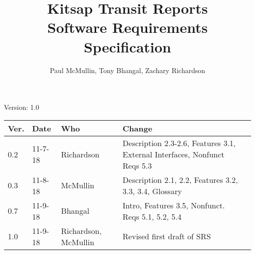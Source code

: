 \documentclass[letterpaper,12pt]{article}
\title{Kitsap Transit Reports\\Software Requirements Specification}
\author{Paul McMullin, Tony Bhangal, Zachary Richardson}
\begin{document}
\maketitle

\begin{center}
  Version: 1.0
\end{center}

\vfill
\begin{tabularx}{\linewidth}{|l|l|l|X|l|}\hline
Ver. & Date & Who & Change \\\hline
0.2     &  11-7-18    &  Richardson   &   Description 2.3-2.6, Features 3.1, External Interfaces, Nonfunct Reqs 5.3  \\\hline
0.3     &  11-8-18    &  McMullin   &  Description 2.1, 2.2, Features 3.2, 3.3, 3.4, Glossary \\\hline
0.7  &   11-9-18   &  Bhangal  & Intro, Features 3.5, Nonfunct. Reqs 5.1, 5.2, 5.4     \\\hline
1.0  &   11-9-18   &  Richardson, McMullin   & Revised first draft of SRS    \\\hline
\end{tabularx}

\newpage







\appendix 

%
%
\end{document}
